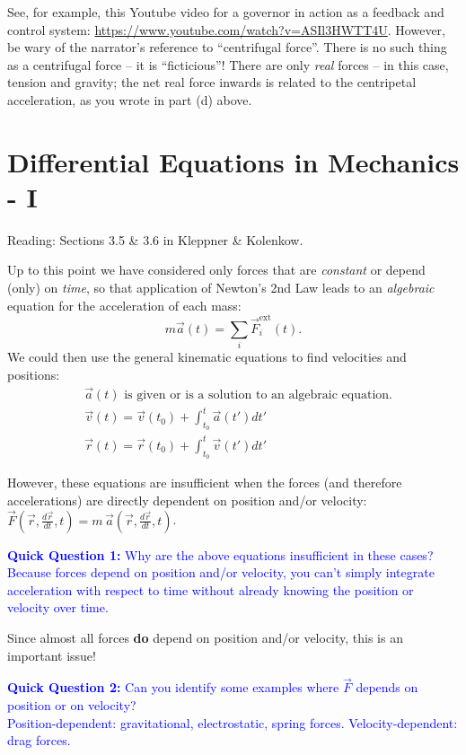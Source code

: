 \documentclass[11pt, letterpaper, openany]{book}
\begin{document}
See, for example, this Youtube video for a governor in action as a feedback and control system: \url{https://www.youtube.com/watch?v=ASIl3HWTT4U}. However, be wary of the narrator's reference to ``centrifugal force''. There is no such thing as a centrifugal force -- it is ``ficticious''! There are only \textit{real} forces -- in this case, tension and gravity; the net real force inwards is related to the centripetal acceleration, as you wrote in part (d) above.

\chapter{Differential Equations in Mechanics - I}

Reading: Sections 3.5 \& 3.6 in Kleppner \& Kolenkow.

Up to this point we have considered only forces that are \textit{constant} or depend (only) on \textit{time}, so that application of Newton's 2nd Law leads to an \textit{algebraic} equation for the acceleration of each mass:
\[ m\vec{a}(t) = \sum_i \vec{F}_i^{\text{ext}}(t). \tag{1} \]
We could then use the general kinematic equations to find velocities and positions:
\begin{align*}
    &\vec{a}(t) \text{ is given or is a solution to an algebraic equation.} \\
    &\vec{v}(t) = \vec{v}(t_0) + \int_{t_0}^t \vec{a}(t')dt' \tag{2} \\
    &\vec{r}(t) = \vec{r}(t_0) + \int_{t_0}^t \vec{v}(t')dt'
\end{align*}

However, these equations are insufficient when the forces (and therefore accelerations) are directly dependent on position and/or velocity: $\vec{F}\left(\vec{r}, \frac{d\vec{r}}{dt}, t\right) = m\,\vec{a}\left(\vec{r}, \frac{d\vec{r}}{dt}, t\right)$.

\textcolor{blue}{\textbf{Quick Question 1:} Why are the above equations insufficient in these cases?} \\
\textcolor{blue}{Because forces depend on position and/or velocity, you can't simply integrate acceleration with respect to time without already knowing the position or velocity over time.}

Since almost all forces \textbf{do} depend on position and/or velocity, this is an important issue!

\textcolor{blue}{\textbf{Quick Question 2:} Can you identify some examples where $\vec{F}$ depends on position or on velocity?} \\
\textcolor{blue}{Position-dependent: gravitational, electrostatic, spring forces. Velocity-dependent: drag forces.}
\end{document}

